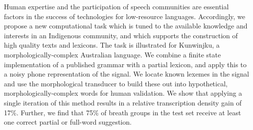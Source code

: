 Human expertise and the participation of speech communities are essential factors in the success of technologies for low-resource languages. Accordingly, we propose a new computational task which is tuned to the available knowledge and interests in an Indigenous community, and which supports the construction of high quality texts and lexicons. The task is illustrated for Kunwinjku, a morphologically-complex Australian language. We combine a finite state implementation of a published grammar with a partial lexicon, and apply this to a noisy phone representation of the signal. We locate known lexemes in the signal and use the morphological transducer to build these out into hypothetical, morphologically-complex words for human validation. We show that applying a single iteration of this method results in a relative transcription density gain of 17\%. Further, we find that 75\% of breath groups in the test set receive at least one correct partial or full-word suggestion.
